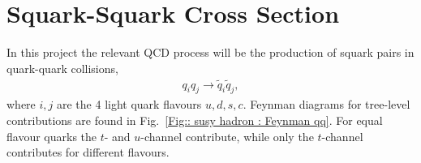 \documentclass[twoside,english]{uiofysmaster}
\begin{document}
{%
%
%


\section{Squark-Squark Cross Section}
In this project the relevant QCD process will be the production of squark pairs in quark-quark collisions,
\begin{align}
q_i q_j \rightarrow \widetilde{q}_i \widetilde{q}_j,
\end{align}
where $i,j$ are the 4 light quark flavours $u, d, s, c$. Feynman diagrams for tree-level contributions are found in Fig.\ \ref{Fig:: susy hadron : Feynman qq}. For equal flavour quarks the $t$- and $u$-channel contribute, while only the $t$-channel contributes for different flavours. 

}
\end{document}
